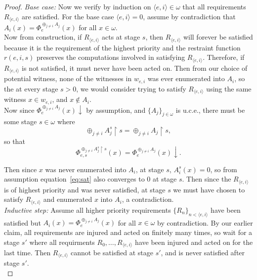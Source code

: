 \documentclass{article}
\begin{document}
\begin{enumerate}[label={(\roman*)}]
\begin{proof}
        \textit{Base case:} Now we verify by induction on $\langle
        e,i\rangle\in\omega$ that all requirements $R_{\langle e,i\rangle}$
        are satisfied. For the base case $\langle e,i\rangle=0$, assume by
        contradiction that $A_i(x)=\Phi_e^{\oplus_{j\neq i} A_j}(x)$ for
        all $x\in\omega$. \\

        Now from construction, if $R_{\langle e,i\rangle}$ acts at stage
        $s$, then $R_{\langle e,i\rangle}$ will forever be satisfied
        because it is the requirement of the highest priority and the
        restraint function $r(e,i,s)$ preserves the computations involved
        in satisfying $R_{\langle e,i\rangle}$. Therefore, if $R_{\langle
        e,i\rangle}$ is not satisfied, it must never have been acted on.
        Then from our choice of potential witness, none of the witnesses in
        $w_{e,i}$ was ever enumerated into $A_i$, so the at every stage
        $s>0$, we would consider trying to satisfy $R_{\langle e,i\rangle}$
        using the same witness $x\in w_{e,i}$, and $x\not\in A_i$. \\

        Now since $\Phi_e^{\oplus_{j\neq i} A_j}(x)\downarrow$ by
        assumption, and $\{A_j\}_{j\in\omega}$ is u.c.e., there must be
        some stage $s\in\omega$ where
        \[\oplus_{j\neq i} A_j^s \restriction s =\oplus_{j\neq i} A_j
        \restriction s,\]
        so that
        \begin{equation}
          \Phi_{e,s}^{\oplus_{j\neq i} A_j^s \restriction s}(x)
          =\Phi_e^{\oplus_{j\neq i} A_j}(x) \downarrow.
          \label{eq:sat}
        \end{equation}

        Then since $x$ was never enumerated into $A_i$, at stage $s$,
        $A_i^s(x)=0$, so from assumption equation~\eqref{eq:sat} also
        converges to 0 at stage $s$. Then since the $R_{\langle
        e,i\rangle}$ is of highest priority and was never satisfied, at
        stage $s$ we must have chosen to satisfy $R_{\langle
        e,i\rangle}$ and enumerated $x$ into $A_i$, a contradiction. \\

        \textit{Inductive step:} Assume all higher priority requirements
        $\{R_n\}_{n <\langle e,i\rangle}$ have been satisfied but
        $A_i(x)=\Phi_e^{\oplus_{j\neq i} A_j}(x)$ for all $x\in\omega$ by
        contradiction. By our earlier claim, all requirements are injured
        and acted on finitely many times, so wait for a stage
        $s'$ where all requirments $R_0,\ldots,R_{\langle e,i\rangle}$ have
        been injured and acted on for the last time. Then $R_{\langle
        e,i\rangle}$ cannot be satisfied at stage $s'$, and is never
        satisfied after stage $s'$. \\


\end{proof}
\end{enumerate}
\end{document}
